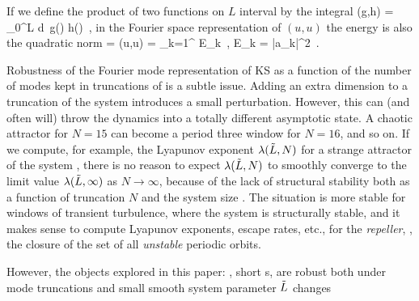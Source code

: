 
If we define the product of two functions on $L$ interval by
the integral
\beq
        (g,h) = \int_0^{L} d\pSpace\, 
		g(\pSpace) h(\pSpace)
        \,,
        \label{rpo:innerProd}
\eeq
in the Fourier space representation of $(u,u)$
the energy 
is also the quadratic norm
\beq
{} = (u,u) = \sum_{k=1}^{\infty} E_k
\,,\qquad 
E_k = %
	|a_k|^2
\,.

Robustness of the Fourier mode representation of KS as
a function of the number of modes kept in truncations 
of  is
a subtle issue.
Adding an extra dimension to a truncation of the system 
introduces a small
perturbation. However, this can (and often will) 
throw the dynamics into a totally different asymptotic state. 
A  chaotic attractor for $N=15$ can become a period three 
window for $N=16$, and so on. 
If we compute, for example, the Lyapunov exponent
$\lambda(\tilde{L},N)$ for a strange attractor of the 
system , there is no reason to 
expect $\lambda(\tilde{L},N)$ to smoothly converge to the limit  
value $\lambda(\tilde{L},\infty)$ as $N \rightarrow \infty$,
because of the lack of structural stability both
as a function of truncation $N$ and the system size \tildeL.
The situation is more stable for windows of transient turbulence, 
where the system is structurally stable, and it makes sense to compute 
 Lyapunov exponents, escape rates, etc., for the 
{\em repeller}, \ie, the closure of the set of all 
{\em unstable} periodic orbits. 

However, the objects explored in this paper: \eqva, short \po s,
are robust both under mode truncations and small smooth
system parameter $\tilde{L}$ changes


\subsection{\Eqva} %
\label{sec:stks}


